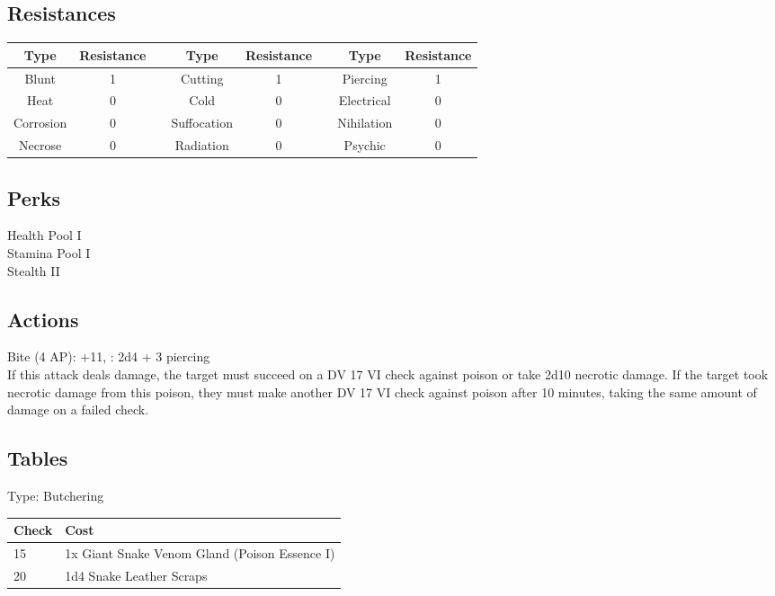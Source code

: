 \subsection{Resistances}
\begin{minipage}[H]{1\textwidth}
	\centering
	\begin{tabular}[c]{|c | c | c | c | c | c | c | c|}
		\hline
		Type & Resistance && Type & Resistance && Type & Resistance\\
		\hline
		Blunt & 1 &&
		Cutting & 1 &&
		Piercing & 1\\
		Heat & 0 &&
		Cold & 0 &&
		Electrical & 0\\
		Corrosion & 0 &&
		Suffocation & 0 &&
		Nihilation & 0 \\
		Necrose & 0 &&
		Radiation & 0 &&
		Psychic & 0\\
		\hline
	\end{tabular}
\end{minipage}

\subsection{Perks}
Health Pool I\\
Stamina Pool I\\
Stealth II\\

\subsection{Actions}
Bite (4 AP): +11, : 2d4 + 3 piercing\\
If this attack deals damage, the target must succeed on a DV 17 VI check against poison or take 2d10 necrotic damage.
If the target took necrotic damage from this poison, they must make another DV 17 VI check against poison after 10 minutes, taking the same amount of damage on a failed check.

\subsection{Tables}
Type: Butchering
\\
\begin{minipage}{0.8\textwidth}
	\begin{tabular}{|l | l|}
		\hline
		Check & Cost\\
		\hline
		15 & 1x Giant Snake Venom Gland (Poison Essence I)\\
		20 & 1d4 Snake Leather Scraps\\
		\hline
	\end{tabular}
\end{minipage}
\pagebreak